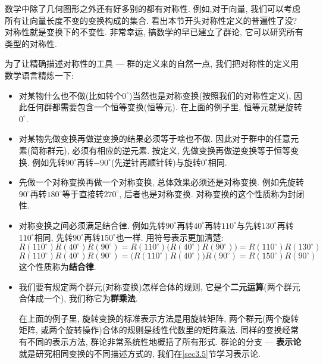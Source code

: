 数学中除了几何图形之外还有好多别的都有对称性. 例如,对于向量, 我们可以考虑所有让向量长度不变的变换构成的集合. 看出本节开头对称性定义的普遍性了没? 对称性就是变换下的不变性. 非常幸运, 搞数学的早已建立了群论, 它可以研究所有类型的对称性.

为了让精确描述对称性的工具 --- 群的定义来的自然一点, 我们把对称性的定义用数学语言精炼一下:
\begin{itemize}
	\item 对某物什么也不做(比如转个$0^\circ$)当然也是对称变换(按照我们的对称性定义), 因此任何群都需要包含一个恒等变换(恒等元). 在上面的例子里, 恒等元就是旋转$0^\circ$.
	
	\item 对某物先做变换再做逆变换的结果必须等于啥也不做. 因此对于群中的任意元素(简称群元), 必须有相应的逆元素. 按定义, 先做变换再做逆变换等于恒等变换. 例如先转$90^\circ$再转$-90^\circ$(先逆针再顺针转)与旋转$0^\circ$相同.
	
	\item 先做一个对称变换再做一个对称变换, 总体效果必须还是对称变换. 例如先旋转$90^\circ$再转$180^\circ$等于直接转$270^\circ$, 后者也是对称变换. 对称变换的这个性质称为封闭性.
	
	\item 对称变换之间必须满足结合律. 例如先转$90^\circ$再转$40^\circ$再转$110^\circ$与先转$130^\circ$再转$110^\circ$相同, 先转$90^\circ$再转$150^\circ$也一样. 用符号表示更加清楚:
	\begin{equation}\label{equ3.1}
	R(110^\circ) R(40^\circ) R(90^\circ) = R(110^\circ)\bigg( R(40^\circ)R(90^\circ) \bigg) = R(110^\circ) R(130^\circ)
	\end{equation}
	\begin{equation}\label{equ3.2}
	R(110^\circ) R(40^\circ) R(90^\circ) = \bigg( R(110^\circ) R(40^\circ) \bigg) R(90^\circ) = R(150^\circ) R(90^\circ)
	\end{equation}
	这个性质称为{\bf 结合律}.
	
	\item 我们要有规定两个群元(对称变换)怎样合体的规则, 它是个{\bf 二元运算}(两个群元合体成一个), 我们称它为{\bf 群乘法}. 
	
	在上面的例子里, 旋转变换的标准表示方法是用旋转矩阵, 两个群元(两个旋转矩阵, 或两个旋转操作)合体的规则是线性代数里的矩阵乘法. 同样的变换经常有不同的表示方法, 群论非常系统性地概括了所有形式. 群论的分支 --- {\bf 表示论}就是研究相同变换的不同描述方式的, 我们在\ref{sec3.5}节学习表示论.
\end{itemize}

